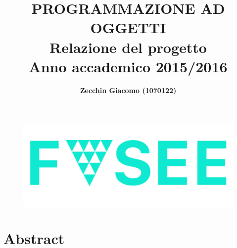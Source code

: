 \documentclass[10pt,a4paper,openany]{article}
\begin{document}
\begin{figure}
\centering
\includegraphics[angle=0,scale=.30]{LOGO.png}
\end{figure} 


\title{ \textbf{\huge PROGRAMMAZIONE AD OGGETTI}\vspace{0.7cm} \\ {\Huge Relazione del progetto} \vspace{0.3cm} \\ {\Large Anno accademico 2015/2016} }
 
\author{\textbf{Zecchin Giacomo (1070122)}}

\maketitle
\thispagestyle{empty}


\pagestyle{fancy}
\lhead{}
\renewcommand{\footrulewidth}{0.5pt}


\tableofcontents \label{sec:index} %



\newpage

\section{Abstract}
\end{document}
